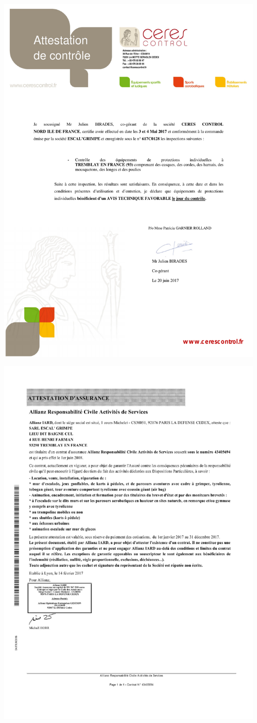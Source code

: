 \documentclass[hidelinks, paper=a4, fontsize=13pt]{report}
\begin{document}
\begin{center}
\includegraphics[width=.8\textwidth,keepaspectratio]{Annexes/Documents/ESCAL-Grimpe-document-EPI-Attestation-de-Suivi}

\includegraphics[width=.8\textwidth,keepaspectratio]{Annexes/Documents/ESCAL-Grimpe-document-RC-Pro}
\end{center}
\end{document}
